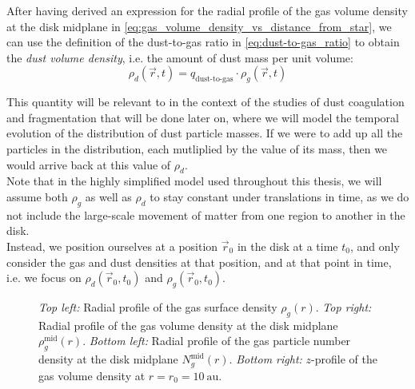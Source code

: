         After having derived an expression for the radial profile of the gas volume density at the 
        disk midplane %
        in \cref{eq:gas_volume_density_vs_distance_from_star}, we can use the definition of the 
        dust-to-gas ratio in \cref{eq:dust-to-gas_ratio} to obtain the 
        \textit{dust volume density}, i.e. the amount of dust mass per unit volume:
        \begin{equation}
            \rho_d(\vec r, t) = q_\text{dust-to-gas} \cdot \rho_g(\vec r, t)
        \end{equation}

        This quantity will be relevant to in the context of the studies of dust coagulation 
        and fragmentation that will be done later on, where we will model the temporal evolution of
        the distribution of dust particle masses. If we were to add up all the particles in the 
        distribution, each mutliplied by the value of its mass, then we would arrive back at this 
        value of $\rho_d$. \\

        Note that in the highly simplified model used throughout this thesis, we will assume both 
        $\rho_g$ as well as $\rho_d$ to stay constant under translations in time, as we do not 
        include the large-scale movement of matter from one region to another in the disk. \\

        Instead, we position ourselves at a position $\vec r_0$ in the disk at a time $t_0$, and
        only consider the gas and dust densities at that position, and at that point in time,
        i.e. we focus on $\rho_d(\vec r_0, t_0)$ and $\rho_g(\vec r_0, t_0)$.


        \clearpage

        \begin{figure}[h!]
            \caption{
                \textit{Top left:} 
                    Radial profile of the gas surface density $\rho_g(r)$.
                \textit{Top right:} 
                    Radial profile of the gas volume density at the disk midplane $\rho_g^\text{mid}(r)$.
                \textit{Bottom left:} 
                    Radial profile of the gas particle number density at the disk midplane 
                    $N_g^\text{mid}(r)$. 
                \textit{Bottom right:}
                    $z$-profile of the gas volume density at $r=r_0=10~\text{au}$.
            }
        \end{figure} 

